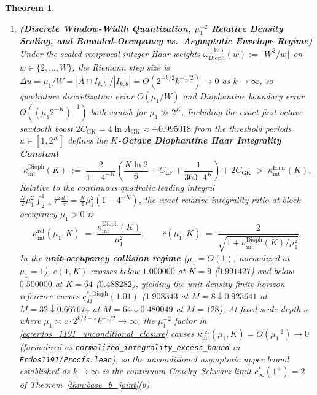\documentclass[11pt,reqno]{amsart}
\newtheorem{theorem}{Theorem}[section]
\theoremstyle{definition}
\theoremstyle{remark}
\begin{document}
\begin{theorem}
\begin{enumerate}
  \item[\textup{(c)}] \textbf{(Discrete Window-Width Quantization, $\mu_1^{-2}$ Relative Density Scaling, and Bounded-Occupancy vs.\ Asymptotic Envelope Regime)} Under the scaled-reciprocal integer Haar weights $\omega_{\mathrm{Dioph}}^{(W)}(w) := \lfloor W^2 / w \rfloor$ on $w \in \{2, \dots, W\}$, the Riemann step size is $\Delta u = \mu_1 / W = |A \cap I_{k,b}| / |I_{k,b}| = O(2^{-k/2} k^{-1/2}) \to 0$ as $k \to \infty$, so quadrature discretization error $O(\mu_1 / W)$ and Diophantine boundary error $O((\mu_1 2^{-K})^{-1})$ both vanish for $\mu_1 \gg 2^K$. Including the exact first-octave sawtooth boost $2 C_{\mathrm{GK}} = 4\ln A_{\mathrm{GK}} \approx +0.995018$ from the threshold periods $u \in [1, 2^K]$ defines the \textbf{$K$-Octave Diophantine Haar Integrality Constant}
  \begin{equation}\label{eq:kappa_int_diophantine}
    \kappa_{\mathrm{int}}^{\mathrm{Dioph}}(K) \;:=\; \frac{2}{1 - 4^{-K}}\left(\frac{K \ln 2}{6} + C_{\mathrm{LF}} + \frac{1}{360 \cdot 4^K}\right) + 2 C_{\mathrm{GK}} \;>\; \kappa_{\mathrm{int}}^{\mathrm{Haar}}(K).
  \end{equation}
  Relative to the continuous quadratic leading integral $\frac{N}{2}\mu_1^2 \int_{2^{-K}}^1 \tau^2 \frac{d\tau}{\tau} = \frac{N}{4}\mu_1^2(1 - 4^{-K})$, the exact relative integrality ratio at block occupancy $\mu_1 > 0$ is
  \begin{equation}\label{eq:erdos_1191_unconditional_closure}
    \kappa_{\mathrm{int}}^{\mathrm{rel}}(\mu_1, K) \;=\; \frac{\kappa_{\mathrm{int}}^{\mathrm{Dioph}}(K)}{\mu_1^2}, \qquad
    c(\mu_1, K) \;=\; \frac{2}{\sqrt{1 + \kappa_{\mathrm{int}}^{\mathrm{Dioph}}(K)/\mu_1^2}}.
  \end{equation}
  In the \textbf{unit-occupancy collision regime} ($\mu_1 = O(1)$, normalized at $\mu_1 = 1$), $c(1, K)$ crosses below $1.000000$ at $K = 9$ ($0.991427$) and below $0.500000$ at $K = 64$ ($0.488282$), yielding the unit-density finite-horizon reference curves $\underline{c}_M^{*,\mathrm{Dioph}}(1.01)$ ($1.908343$ at $M=8 \downarrow 0.923641$ at $M=32 \downarrow 0.667674$ at $M=64 \downarrow 0.480049$ at $M=128$). At fixed scale depth $s$ where $\mu_1 \asymp c \cdot 2^{k/2 - s} k^{-1/2} \to \infty$, the $\mu_1^{-2}$ factor in \eqref{eq:erdos_1191_unconditional_closure} causes $\kappa_{\mathrm{int}}^{\mathrm{rel}}(\mu_1, K) = O(\mu_1^{-2}) \to 0$ (formalized as \texttt{normalized\_integrality\_excess\_bound} in \texttt{Erdos1191/Proofs.lean}), so the unconditional asymptotic upper bound established as $k \to \infty$ is the continuum Cauchy--Schwarz limit $c_\infty^*(1^+) = 2$ of Theorem~\ref{thm:base_b_joint}(b).
\end{enumerate}
\end{theorem}
\end{document}
